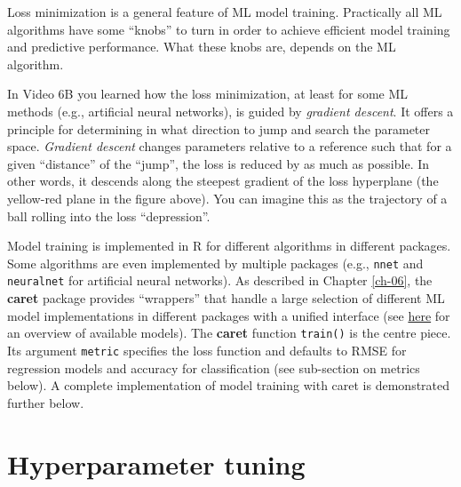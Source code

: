 \documentclass[
]{book}
\begin{document}
Loss minimization is a general feature of ML model training. Practically all ML algorithms have some ``knobs'' to turn in order to achieve efficient model training and predictive performance. What these knobs are, depends on the ML algorithm.

In Video 6B you learned how the loss minimization, at least for some ML methods (e.g., artificial neural networks), is guided by \emph{gradient descent}. It offers a principle for determining in what direction to jump and search the parameter space. \emph{Gradient descent} changes parameters relative to a reference such that for a given ``distance'' of the ``jump'', the loss is reduced by as much as possible. In other words, it descends along the steepest gradient of the loss hyperplane (the yellow-red plane in the figure above). You can imagine this as the trajectory of a ball rolling into the loss ``depression''.

Model training is implemented in R for different algorithms in different packages. Some algorithms are even implemented by multiple packages (e.g., \texttt{nnet} and \texttt{neuralnet} for artificial neural networks). As described in Chapter \ref{ch-06}, the \textbf{caret} package provides ``wrappers'' that handle a large selection of different ML model implementations in different packages with a unified interface (see \href{https://topepo.github.io/caret/available-models.html}{here} for an overview of available models). The \textbf{caret} function \texttt{train()} is the centre piece. Its argument \texttt{metric} specifies the loss function and defaults to RMSE for regression models and accuracy for classification (see sub-section on metrics below). A complete implementation of model training with caret is demonstrated further below.

\hypertarget{hyperparameter-tuning}{%
\section{Hyperparameter tuning}\label{hyperparameter-tuning}}
\end{document}
